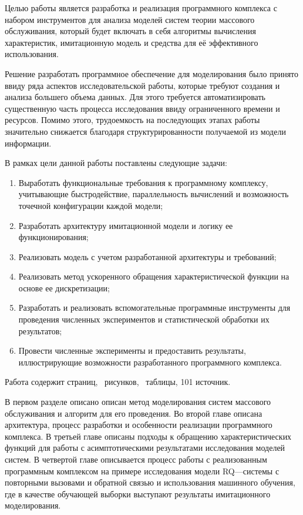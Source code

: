  Целью работы является разработка и реализация программного комплекса с набором инструментов для анализа моделей систем теории массового обслуживания, который будет включать в себя алгоритмы вычисления характеристик, имитационную модель и средства для её эффективного использования.

Решение разработать программное обеспечение для моделирования было принято ввиду ряда аспектов исследовательской работы, которые требуют создания и анализа большего объема данных. Для этого требуется автоматизировать существенную часть процесса исследования ввиду ограниченного времени и ресурсов. Помимо этого, трудоемкость на последующих этапах работы значительно снижается благодаря структурированности получаемой из модели информации.

В рамках цели данной работы поставлены следующие задачи:
\begin{enumerate}
	\item Выработать функциональные требования к программному комплексу, учитывающие быстродействие, параллельность вычислений и возможность точечной конфигурации каждой модели;
	\item Разработать архитектуру имитационной модели и логику ее функционирования;
	\item Реализовать модель с учетом разработанной архитектуры и требований;
	\item Реализовать метод ускоренного обращения характеристической функции на основе ее дискретизации;
	\item Разработать и реализовать вспомогательные программные инструменты для проведения численных экспериментов и статистической обработки их результатов;
	\item Провести численные эксперименты и предоставить результаты, иллюстрирующие возможности разработанного программного комплекса.
\end{enumerate}

Работа содержит \pageref{LastPage} страниц, \totalfigures\ рисунков, \totaltables\ таблицы, 101 источник.

В первом разделе описано описан метод моделирования систем массового обслуживания и алгоритм для его проведения. Во второй главе описана архитектура, процесс разработки и особенности реализации программного комплекса. В третьей главе описаны подходы к обращению характеристических функций для работы с асимптотическими результатами исследования моделей систем. В четвертой главе описывается процесс работы с реализованным программным комплексом на примере исследования модели RQ---системы с повторными вызовами и обратной связью и использования машинного обучения, где в качестве обучающей выборки выступают результаты имитационного моделирования.
 \clearpage
 